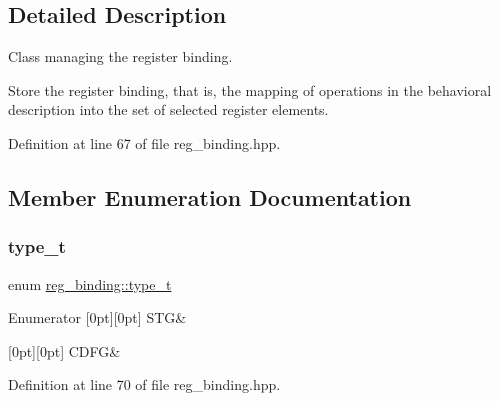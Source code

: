 \subsection{Detailed Description}
Class managing the register binding. 

Store the register binding, that is, the mapping of operations in the behavioral description into the set of selected register elements. 

Definition at line 67 of file reg\+\_\+binding.\+hpp.



\subsection{Member Enumeration Documentation}
\mbox{\label{classreg__binding_a925bc3c7414dec8215c074821438f67d}} 
\subsubsection{\texorpdfstring{type\+\_\+t}{type\_t}}
{\footnotesize\ttfamily enum \hyperlink{classreg__binding_a925bc3c7414dec8215c074821438f67d}{reg\+\_\+binding\+::type\+\_\+t}}

\begin{DoxyEnumFields}{Enumerator}
[0pt][0pt]{}\mbox{\label{classreg__binding_a925bc3c7414dec8215c074821438f67dadb264c2d0f6020d5e2e39f8ef3e56b4a}} 
S\+TG&\\
\hline

[0pt][0pt]{}\mbox{\label{classreg__binding_a925bc3c7414dec8215c074821438f67da2fc6dfb888709b3c6611995ac85d26cc}} 
C\+D\+FG&\\
\hline

\end{DoxyEnumFields}


Definition at line 70 of file reg\+\_\+binding.\+hpp.



